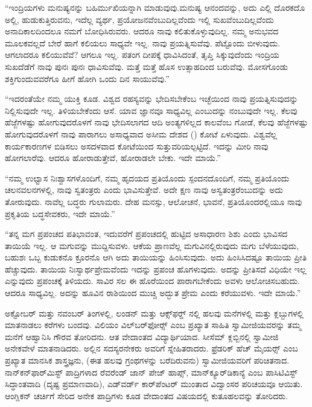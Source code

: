  “ಇಂದ್ರಿಯಗಳು ಮನುಷ್ಯನನ್ನು ಬಹಿರ್ಮುಖಿಯನ್ನಾಗಿ ಮಾಡುವುವು.\break ಮನುಷ್ಯ ಆನಂದವನ್ನು, ಅದು ಎಲ್ಲಿ ದೊರಕದೊ ಅಲ್ಲಿ, ಹುಡುಕುತ್ತಿರುವನು, ಇದೆಲ್ಲ ವ್ಯರ್ಥ, ಪ್ರಯೋಜನವೆಂಬುದಿಲ್ಲವೆಂದು ಇಲ್ಲಿ ಸುಖವೆಂಬುದಿಲ್ಲವೆಂದು ಅನಾದಿಕಾಲದಿಂದಲೂ ನಮಗೆ ಬೋಧಿಸಿರುವರು. ಆದರೂ ನಾವು ಕಲಿತುಕೊಳ್ಳುವುದಿಲ್ಲ. ನಮ್ಮ ಅನುಭವದ ಮೂಲಕವಲ್ಲದೆ ಬೇರೆ ಹಾಗೆ ಕಲಿಯಲು ಸಾಧ್ಯವೇ ಇಲ್ಲ. ನಾವು ಪ್ರಯತ್ನಿಸುವೆವು. ಪೆಟ್ಟೊಂದು ಬೀಳುವುದು. ಆಗಲಾದರೂ ಕಲಿಯುವೆವೆ? ಆಗಲೂ ಇಲ್ಲ. ಪತಂಗ ದೀಪಕ್ಕೆ ಧಾವಿಸಿದಂತೆ, ತೃಪ್ತಿ ಸಿಕ್ಕುವುದೆಂದು ಇಂದ್ರಿಯ ಸುಖದೆಡೆಗೆ ನಾವು ಪುನಃ ಪುನಃ ಧಾವಿಸುವೆವು. ಮತ್ತೆ ಮತ್ತೆ ಹೊಸ ಉತ್ಸಾಹದಿಂದ ಬರುವೆವು. ಮೋಸಗೊಂಡು ಶಕ್ತಿಗುಂದುವವರೆಗೂ ಹೀಗೆ ಹೋಗಿ ಒಂದು ದಿನ ಸಾಯುವೆವು.” 

 “ಇದರಂತೆಯೇ ನಮ್ಮ ಯುಕ್ತಿ ಕೂಡ. ವಿಶ್ವದ ರಹಸ್ಯವನ್ನು ಭೇದಿಸಬೇಕೆಂಬ ಇಚ್ಛೆಯಿಂದ ನಾವು ಪ್ರಯತ್ನಿಸುವುದನ್ನು ನಿಲ್ಲಿಸುವುದೇ ಇಲ್ಲ. ತಿಳಿಯಬೇಕೆಂದು ಆಸೆ. ಯಾವ ಜ್ಞಾನವೂ ಸಾಧ್ಯವಿಲ್ಲ ಎಂಬುದನ್ನು ನಂಬುವುದೇ ಇಲ್ಲ. ಕೆಲವು ಹೆಜ್ಜೆಗಳಷ್ಟು ಹೋಗುವುದರೊಳಗೆ ನಾವು ಭೇದಿಸಲಾಗದ ಆದಿ ಅಂತ್ಯಗಳಿಲ್ಲದ ಕಾಲವೆಂಬ ಗೋಡೆ, ಕೆಲವು ಹೆಜ್ಜೆಗಳಷ್ಟು ಹೋಗುವುದರೊಳಗೆ ನಾವು ಪಾರಾಗಲು ಅಸಾಧ್ಯವಾದ ಅಸೀಮ ದೇಶದ () ಕೋಟೆ ಏಳುವುದು. ವಿಶ್ವವೆಲ್ಲ ಕಾರ್ಯಕಾರಣಗಳ ಬಿಡಿಸಲು ಅಸದಳವಾದ ಕೋಟೆಯಿಂದ ಸುತ್ತುವರಿಯಲ್ಪಟ್ಟಿದೆ. ಇದನ್ನು ಮೀರಿ ನಾವು ಹೋಗಲಾರೆವು. ಆದರೂ ಹೋರಾಡುತ್ತೇವೆ, ಹೋರಾಡಲೇ ಬೇಕು. ಇದೇ ಮಾಯೆ.” 

 “ನಮ್ಮ ಉಛ್ವಾಸ ನಿಃಶ್ವಾಸಗಳೊಂದಿಗೆ, ನಮ್ಮ ಹೃದಯದ ಪ್ರತಿಯೊಂದು ಸ್ಪಂದನದೊಂದಿಗೆ, ನಮ್ಮ ಪ್ರತಿಯೊಂದು ಚಲನವಲನಗಳಲ್ಲಿ, ನಾವು ಸ್ವತಂತ್ರರು ಎಂದು ಭಾವಿಸುತ್ತೇವೆ. ಅದೇ ಕ್ಷಣ ನಾವು ಅಸ್ವತಂತ್ರರೆಂಬುದನ್ನು ಅದು ತೋರುವುದು. ನಾವೆಲ್ಲ ಬದ್ಧರು ಗುಲಾಮರು. ದೇಹ ಮನಸ್ಸು, ಆಲೋಚನೆ, ಭಾವನೆ, ಪ್ರತಿಯೊಂದರಲ್ಲಿಯೂ ನಾವು ಪ್ರಕೃತಿಯ ಬದ್ಧಸೇವಕರು, ಇದೇ ಮಾಯೆ.” 

 “ತನ್ನ ಮಗ ಪ್ರಪಂಚದ ಪತಿಭಾವಂತ, ಇದುವರೆಗೆ ಪ್ರಪಂಚದಲ್ಲಿ ಹುಟ್ಟಿದ ಅಸಾಧಾರಣ ಶಿಶು ಎಂದು ಭಾವಿಸದ ತಾಯಿಯೆ ಇಲ್ಲ. ಆ ಮಗುವನ್ನು ಮುದ್ದಿಸುವಳು. ಆಕೆಯ ಪ್ರಾಣವೆಲ್ಲ ಮಗುವಿನಲ್ಲಿರುವುದು ಮಗು ಬೆಳೆಯುವುದು, ಬಹುಶಃ ಒಬ್ಬ ಕುಡುಕನೊ ಕ್ರೂರನೊ ಆಗಿ ಅದು ತಾಯಿಯನ್ನು ಹಿಂಸಿಸುವುದು. ಅದು ಹಿಂಸಿಸಿದಷ್ಟೂ ತಾಯಿಯ ಪ್ರೀತಿ ಹೆಚ್ಚುವುದು. ತಾಯಿಯ ನಿಃಸ್ವಾರ್ಥಪ್ರೇಮವೆಂದು ಇದನ್ನು ಪ್ರಪಂಚ ಹೊಗಳುವುದು. ಅದನ್ನು ಪ್ರೀತಿಸದೆ ವಿಧಿಯೇ ಇಲ್ಲ ಎನ್ನುವುದು ಪ್ರಪಂಚಕ್ಕೆ ತಿಳಿಯದು. ಸಾವಿರ ಸಲ ಈ ಹೊರೆಯಿಂದ ಪಾರಾಗಬೇಕೆಂದು ಅವಳು ಆಲೋಚಿಸಬಹುದು. ಆದರೂ ಸಾಧ್ಯವಿಲ್ಲ. ಅದನ್ನು ಹೂವಿನ ರಾಶಿಯಿಂದ ಮುಚ್ಚಿ ಅದ್ಭುತ ಪ್ರೇಮ ಎಂದು ಕರೆಯುವಳು. ಇದೇ ಮಾಯೆ.” 

 ಅಕ್ಟೋಬರ್ ಮತ್ತು ನವಂಬರ್ ತಿಂಗಳಲ್ಲಿ, ಲಂಡನ್ ಮತ್ತು ಆಕ್ಸ್‌ಫರ್ಡ್‍ ನಲ್ಲಿ ಹಲವು ಮನೆಗಳಲ್ಲಿ ಮತ್ತು ಕ್ಲಬ್ಬುಗಳಲ್ಲಿ ಮಾತನಾಡಲು ಕರೆಗಳು ಬಂದವು. ವಿಲಿಯಂ ವಿಲ್‌ಬರ್‌ಫೋರ್ಸ್‍ ಎಂಬ ಪ್ರಖ್ಯಾತ ಸಾಹಿತಿ ಸ್ವಾಮೀಜಿಯವರನ್ನು ತಮ್ಮ ಮನೆಗೆ ಆಹ್ವಾನಿಸಿ ಗೌರವ ತೋರಿದನು. ಆತ ವೇದಾಂತದ ವಿದ್ಯಾರ್ಥಿಯಾದ. ಸೀಸೆಮ್ ಕ್ಲಬ್ಬಿನಲ್ಲಿ ಸ್ವಾಮೀಜಿ ಅನೇಕವೇಳೆ ಮಾತನಾಡಿದರು. ಅಲ್ಲಿನ ಸದಸ್ಯರನೇಕರು ಅವರಿಗೆ ಸ್ನೇಹಿತರಾದರು. ಫ್ರೆಡರಿಕ್ ಹೆಚ್ ಮೈಯರ್ಸ್‍ ಎಂಬ ಪ್ರಖ್ಯಾತ ಮಾನಸಿಕ ಶಾಸ್ತ್ರಜ್ಞನು, (ಈತ ಹಲವು ಗ್ರಂಥಗಳನ್ನು ಬರೆದಿರುವನು) ಸ್ವಾಮೀಜಿಯವರಿಗೆ ಪರಿಚಿತನಾದ. ನಾನ್‌ಕನ್‌ಫಾರ್‌ಮಿಸ್ಟ್ ಪಾದ್ರಿಗಳಾದ ರೆವರೆಂಡ್ ಜಾನ್ ಪೇಜ್ ಹಾಪ್ಸ್, ಮಾನ್‌ಕ್ಯೂರ್‌ಡಿಕಾನ್ಯೆ ಎಂಬ ಪಾಸಿಟಿವಿಸ್ಟ್ ಸಿದ್ಧಾಂತವಾದಿ (ದೃಷ್ಟ ಪ್ರಮಾಣವಾದಿ), ಎಡ್‌ವರ್ಡ್ ಕಾರ್‌ಪೆಂಟರ್ ಮುಂತಾದ ವಿದ್ವಾಂಸರ ಪರಿಚಯವೂ ಆಯಿತು. ಆಂಗ್ಲಿಕನ್ ಚರ್ಚಿಗೆ ಸೇರಿದ ಅನೇಕ ಪಾದ್ರಿಗಳು ಕೂಡ ವೇದಾಂತದ ವಿಷಯದಲ್ಲಿ ಕುತೂಹಲವನ್ನು ತೋರಿದರು. 

